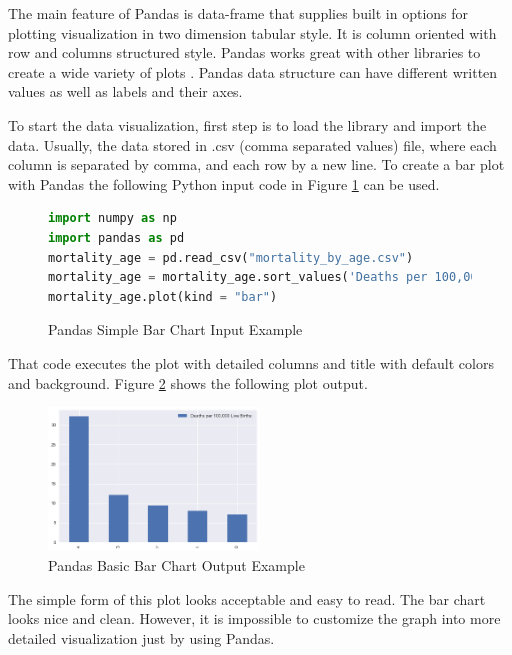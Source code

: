 \documentclass[sigconf]{acmart}
\begin{document}
The main feature of Pandas is data-frame that supplies built in options for plotting visualization in two dimension tabular style. It is column oriented with row and columns structured style.  Pandas works great with other libraries to create a wide variety of plots \cite{hunter2007matplotlib}. Pandas data structure can have different written values as well as labels and their axes. 

To start the data visualization, first step is to load the library and import the data. Usually, the data stored in .csv (comma separated values) file, where each column is separated by comma, and each row by a new line. To create a bar plot with Pandas the following Python input code in Figure \ref{fig:figure1} \cite{md}can be used.

\begin{figure}
 
\begin{lstlisting}[language=Python]
import numpy as np
import pandas as pd
mortality_age = pd.read_csv("mortality_by_age.csv")
mortality_age = mortality_age.sort_values('Deaths per 100,000 Live Births:', ascending = False)[:5]
mortality_age.plot(kind = "bar")
\end{lstlisting}
 
\caption{Pandas Simple Bar Chart Input Example \cite{md}}
\label{fig:figure1}
\end{figure}

That code executes the plot with detailed columns and title with default colors and background. Figure \ref{fig:figure2} shows the following plot output.

\begin{figure}
  \centering
  \includegraphics[width=0.5\textwidth]{images/output_0_1.png}
  \caption{Pandas Basic Bar Chart Output Example \cite{md}} \label{fig:figure2} 
\end{figure}

The simple form of this plot looks acceptable and easy to read. The bar chart looks nice and clean. However, it is impossible to customize the graph into more detailed visualization just by using Pandas.
\end{document}
